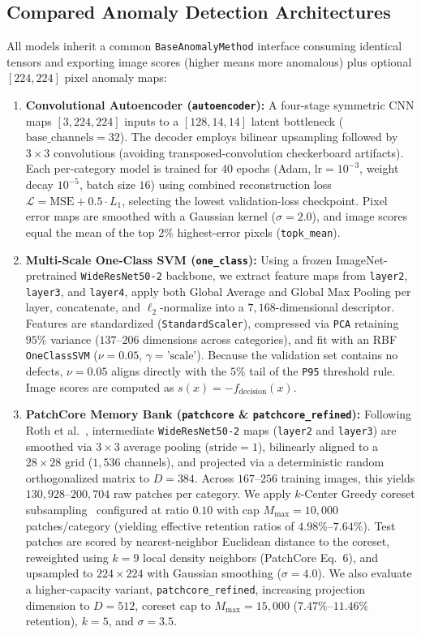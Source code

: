 \documentclass[conference]{IEEEtran}
\begin{document}
\subsection{Compared Anomaly Detection Architectures}
All models inherit a common \texttt{BaseAnomalyMethod} interface consuming identical tensors and exporting image scores (higher means more anomalous) plus optional $[224, 224]$ pixel anomaly maps:
\begin{enumerate}
    \item \textbf{Convolutional Autoencoder (\texttt{autoencoder}):} A four-stage symmetric CNN maps $[3, 224, 224]$ inputs to a $[128, 14, 14]$ latent bottleneck ($\text{base\_channels}=32$). The decoder employs bilinear upsampling followed by $3\times 3$ convolutions (avoiding transposed-convolution checkerboard artifacts). Each per-category model is trained for $40$ epochs (Adam, $\text{lr}=10^{-3}$, weight decay $10^{-5}$, batch size $16$) using combined reconstruction loss $\mathcal{L} = \text{MSE} + 0.5\cdot L_1$, selecting the lowest validation-loss checkpoint. Pixel error maps are smoothed with a Gaussian kernel ($\sigma=2.0$), and image scores equal the mean of the top $2\%$ highest-error pixels (\texttt{topk\_mean}).
    \item \textbf{Multi-Scale One-Class SVM (\texttt{one\_class}):} Using a frozen ImageNet-pretrained \texttt{WideResNet50-2} backbone, we extract feature maps from \texttt{layer2}, \texttt{layer3}, and \texttt{layer4}, apply both Global Average and Global Max Pooling per layer, concatenate, and $\ell_2$-normalize into a $7{,}168$-dimensional descriptor. Features are standardized (\texttt{StandardScaler}), compressed via \texttt{PCA} retaining $95\%$ variance ($137$--$206$ dimensions across categories), and fit with an RBF \texttt{OneClassSVM} ($\nu=0.05$, $\gamma=\text{'scale'}$). Because the validation set contains no defects, $\nu=0.05$ aligns directly with the $5\%$ tail of the \texttt{P95} threshold rule. Image scores are computed as $s(x) = -f_{\text{decision}}(x)$.
    \item \textbf{PatchCore Memory Bank (\texttt{patchcore} \& \texttt{patchcore\_refined}):} Following Roth et al.~\cite{roth2022towards}, intermediate \texttt{WideResNet50-2} maps (\texttt{layer2} and \texttt{layer3}) are smoothed via $3\times 3$ average pooling ($\text{stride}=1$), bilinearly aligned to a $28\times 28$ grid ($1{,}536$ channels), and projected via a deterministic random orthogonalized matrix to $D=384$. Across $167$--$256$ training images, this yields $130{,}928$--$200{,}704$ raw patches per category. We apply $k$-Center Greedy coreset subsampling~\cite{sener2018active} configured at ratio $0.10$ with cap $M_{\max}=10{,}000$ patches/category (yielding effective retention ratios of $4.98\%$--$7.64\%$). Test patches are scored by nearest-neighbor Euclidean distance to the coreset, reweighted using $k=9$ local density neighbors (PatchCore Eq.~6), and upsampled to $224\times 224$ with Gaussian smoothing ($\sigma=4.0$). We also evaluate a higher-capacity variant, \texttt{patchcore\_refined}, increasing projection dimension to $D=512$, coreset cap to $M_{\max}=15{,}000$ ($7.47\%$--$11.46\%$ retention), $k=5$, and $\sigma=3.5$.
\end{enumerate}
\end{document}
